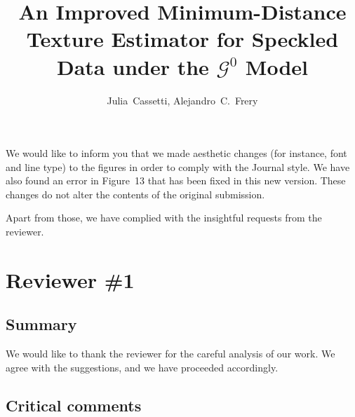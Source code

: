 \documentclass{ar2rc}
\title{An Improved Minimum-Distance Texture Estimator for Speckled Data under the $\mathcal{G}^0$ Model}
\author{Julia~Cassetti,
	Alejandro~C.~Frery}
\begin{document}
	
	\maketitle
	
We would like to inform you that we made aesthetic changes (for instance, font and line type) to the figures in order to comply with the Journal style.
We have also found an error in Figure~13 that has been fixed in this new version.
These changes do not alter the contents of the original submission.

Apart from those, we have complied with the insightful requests from the reviewer.
	
	\section{Reviewer \#1}
	
	\subsection{Summary}
	
	
	\AR We would like to thank the reviewer for the careful analysis of our work.
	We agree with the suggestions, and we have proceeded accordingly.
	
	\subsection{Critical comments}
	
	
\end{document}
